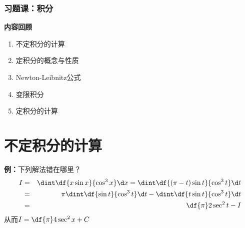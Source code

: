 \begin{frame}
	\frametitle{习题课：积分}
	\linespread{1.5}
	{\bf 内容回顾}
	\begin{enumerate}
	  \item 不定积分的计算
	    \item 定积分的概念与性质
	    \item Newton-Leibnitz公式
	    \item 变限积分
	    \item 定积分的计算
	\end{enumerate}
\end{frame}


\section{不定积分的计算}

\begin{frame}
	\linespread{1.2}
	\begin{exampleblock}{{\bf 例：}下列解法错在哪里？}
		\begin{eqnarray*}
			I&=&\dint\df{x\sin x}{\cos^3x}\d x
			=\dint\df{(\pi-t)\sin t}{\cos^3 t}\d t\\
			&=&\pi\dint\df{\sin t}{\cos^3t}\d t-\dint
			\df{t\sin t}{\cos^3t}\d t\\
			&=&\df{\pi}2\sec^2t-I
		\end{eqnarray*}
		从而$I=\df{\pi}4\sec^2x+C$
	\end{exampleblock}
\end{frame}

